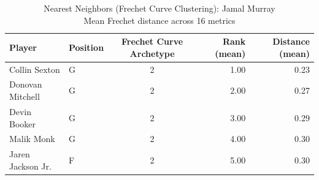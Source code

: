\begin{table}[t]
\caption*{
{\fontsize{20}{25} Nearest Neighbors (Frechet Curve Clustering): Jamal Murray\fontsize{12}{15}\selectfont } \\ 
{\fontsize{14}{17}\selectfont  Mean Frechet distance across 16 metrics\fontsize{12}{15}\selectfont }
} 
\fontsize{12.0pt}{14.0pt}\selectfont
\begin{tabular*}{\linewidth}{@{\extracolsep{\fill}}llcrr}
\toprule
Player & Position & Frechet Curve Archetype & Rank (mean) & Distance (mean) \\ 
\midrule\addlinespace[2.5pt]
Collin Sexton & G & 2 & 1.00 & 0.23 \\ 
Donovan Mitchell & G & 2 & 2.00 & 0.27 \\ 
Devin Booker & G & 2 & 3.00 & 0.29 \\ 
Malik Monk & G & 2 & 4.00 & 0.30 \\ 
Jaren Jackson Jr. & F & 2 & 5.00 & 0.30 \\ 
\bottomrule
\end{tabular*}
\end{table}


